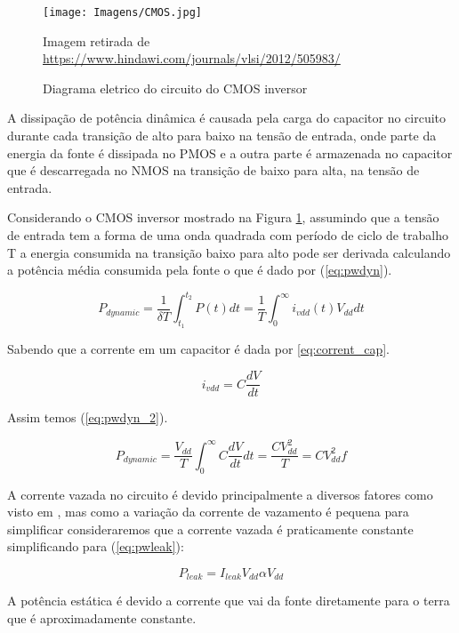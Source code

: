 \begin{figure}[H]
\centering
\texttt{[image: Imagens/CMOS.jpg]}
\caption{Diagrama eletrico do circuito do CMOS inversor}{Imagem retirada de \protect\url{https://www.hindawi.com/journals/vlsi/2012/505983/}}
\label{fig:CMOS}
\end{figure}

A dissipação de potência dinâmica é causada pela carga do capacitor no circuito durante cada transição de alto para baixo na tensão de entrada, onde parte da energia da fonte é dissipada no PMOS e a outra parte é armazenada no capacitor que é descarregada no NMOS na transição de baixo para alta, na tensão de entrada.

Considerando o CMOS inversor mostrado na Figura \ref{fig:CMOS}, assumindo que a tensão de entrada tem a forma de uma onda quadrada com período de ciclo de trabalho T a energia consumida na transição baixo para alto pode ser derivada calculando a potência média consumida pela fonte o que é dado por (\ref{eq:pwdyn}).

\begin{equation}
P_{dynamic}=\frac{1}{\delta T}\int_{t_1}^{t_2}P(t)dt=\frac{1}{T}\int_{0}^{\infty}i_{vdd}(t)V_{dd}dt \label{eq:pwdyn}
\end{equation}

Sabendo que a corrente em um capacitor é dada por \ref{eq:corrent_cap}.

\begin{equation}
i_{vdd}=C\frac{dV}{dt} \label{eq:corrent_cap}
\end{equation}

Assim temos (\ref{eq:pwdyn_2}).

\begin{equation}
P_{dynamic}=\frac{V_{dd}}{T}\int_{0}^{\infty}C\frac{dV}{dt}dt=\frac{CV_{dd}^2}{T}=CV_{dd}^2f \label{eq:pwdyn_2}
\end{equation}

A corrente vazada no circuito é devido principalmente a diversos fatores como visto em \cite{Butzen2007}, mas como a variação da corrente de vazamento é pequena para simplificar consideraremos que a corrente vazada é praticamente constante simplificando para (\ref{eq:pwleak}):

\begin{equation}
P_{leak}=I_{leak}V_{dd}\alpha V_{dd} \label{eq:pwleak}
\end{equation}

A potência estática é devido a corrente que vai da fonte diretamente para o terra que é aproximadamente constante.


